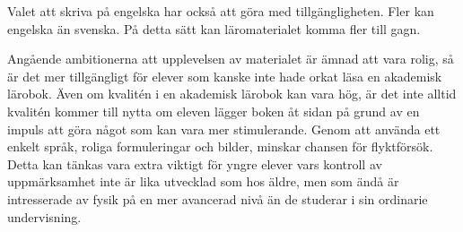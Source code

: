 Valet att skriva på engelska har också att göra med tillgängligheten. Fler kan
engelska än svenska. På detta sätt kan läromaterialet komma fler till gagn.

Angående ambitionerna att upplevelsen av materialet är ämnad att
vara rolig, så är det mer tillgängligt för elever som kanske inte hade orkat
läsa en akademisk lärobok. Även om kvalitén i en akademisk lärobok kan vara hög,
är det inte alltid kvalitén kommer till nytta om eleven lägger boken åt sidan på
grund av en impuls att göra något som kan vara mer stimulerande.  Genom att
använda ett enkelt språk, roliga formuleringar och bilder, minskar chansen för
flyktförsök. Detta kan tänkas vara extra viktigt för yngre elever vars kontroll
av uppmärksamhet inte är lika utvecklad som hos äldre, men som ändå är
intresserade av fysik på en mer avancerad nivå än de studerar i sin ordinarie
undervisning.
